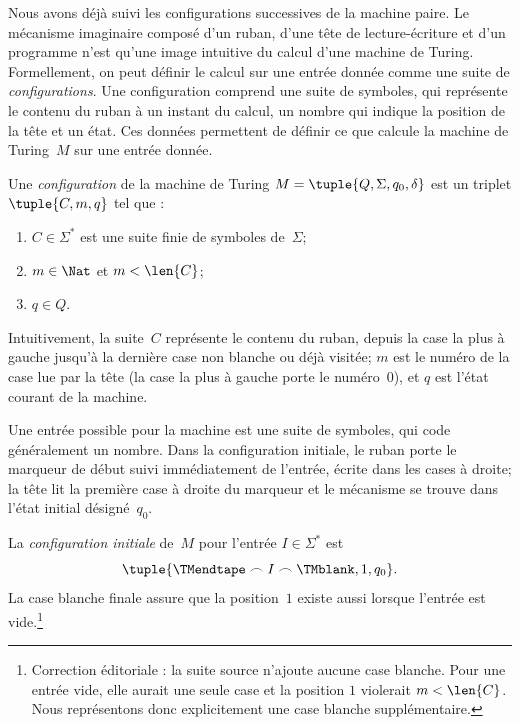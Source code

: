 \documentclass[../../../include/open-logic-section]{subfiles}
\begin{document}

\begin{explain}
Nous avons déjà suivi les configurations successives
de la machine paire. Le mécanisme imaginaire composé
d'un ruban, d'une tête de lecture-écriture et d'un
programme n'est qu'une image intuitive du calcul
d'une machine de Turing. Formellement, on peut
définir le calcul sur une entrée donnée comme une
suite de \emph{configurations}. Une configuration
comprend une suite de symboles, qui représente le
contenu du ruban à un instant du calcul, un nombre
qui indique la position de la tête et un état.
Ces données permettent de définir ce que calcule
la machine de Turing~$M$ sur une entrée donnée.
\end{explain}

\begin{defn}[Configuration]
Une \emph{configuration} de la machine de Turing
$M=\tuple{Q,\Sigma,q_0,\delta}$ est un triplet
$\tuple{C,m,q}$ tel que :
\begin{enumerate}
\item $C\in\Sigma^*$ est une suite finie de
  symboles de~$\Sigma$;
\item $m\in\Nat$ et $m<\len{C}$;
\item $q\in Q$.
\end{enumerate}
Intuitivement, la suite~$C$ représente le contenu
du ruban, depuis la case la plus à gauche jusqu'à
la dernière case non blanche ou déjà visitée;
$m$ est le numéro de la case lue par la tête
(la case la plus à gauche porte le numéro~$0$),
et $q$ est l'état courant de la machine.
\end{defn}

\begin{explain}
Une entrée possible pour la machine est une suite
de symboles, qui code généralement un nombre.
Dans la configuration initiale, le ruban porte
le marqueur de début suivi immédiatement de
l'entrée, écrite dans les cases à droite;
la tête lit la première case à droite du marqueur
et le mécanisme se trouve dans l'état initial
désigné~$q_0$.
\end{explain}

\begin{defn}
La \emph{configuration initiale} de~$M$ pour
l'entrée $I\in\Sigma^*$ est
\[
\tuple{\TMendtape \frown I \frown \TMblank, 1, q_0}.
\]
La case blanche finale assure que la position~$1$
existe aussi lorsque l'entrée est vide.\footnote{Correction éditoriale : la suite source n'ajoute aucune case blanche. Pour une entrée vide, elle aurait une seule case et la position $1$ violerait $m<\len{C}$. Nous représentons donc explicitement une case blanche supplémentaire.}
\end{defn}
\end{document}
